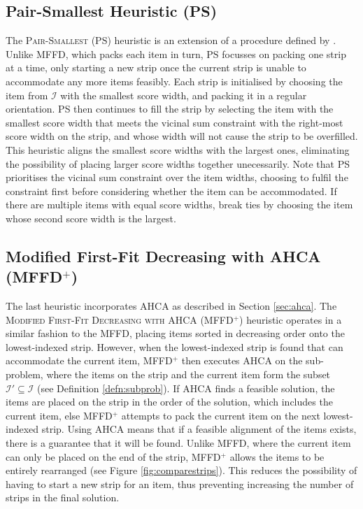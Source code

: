 \documentclass[oribibl]{llncs}
\begin{document}
\subsection{Pair-Smallest Heuristic (PS)}
\label{sec:ps}

The \textsc{Pair-Smallest} (PS) heuristic is an extension of a procedure defined by \cite{lewis2011}. Unlike MFFD, which packs each item in turn, PS focusses on packing one strip at a time, only starting a new strip once the current strip is unable to accommodate any more items feasibly. Each strip is initialised by choosing the item from $\mathcal{I}$ with the smallest score width, and packing it in a regular orientation. PS then continues to fill the strip by selecting the item with the smallest score width that meets the vicinal sum constraint with the right-most score width on the strip, and whose width will not cause the strip to be overfilled. This heuristic aligns the smallest score widths with the largest ones, eliminating the possibility of placing larger score widths together unecessarily. Note that PS prioritises the vicinal sum constraint over the item widths, choosing to fulfil the constraint first before considering whether the item can be accommodated. If there are multiple items with equal score widths, break ties by choosing the item whose second score width is the largest.



\subsection{Modified First-Fit Decreasing with AHCA (MFFD$^+$)}
\label{sec:mffd+}

The last heuristic incorporates AHCA as described in Section \ref{sec:ahca}. The \textsc{Modified First-Fit Decreasing with AHCA} (MFFD$^+$) heuristic operates in a similar fashion to the MFFD, placing items sorted in decreasing order onto the lowest-indexed strip. However, when the lowest-indexed strip is found that can accommodate the current item, MFFD$^+$ then executes AHCA on the sub-problem, where the items on the strip and the current item form the subset $\mathcal{I}' \subseteq \mathcal{I}$ (see Definition \ref{defn:subprob}). If AHCA finds a feasible solution, the items are placed on the strip in the order of the solution, which includes the current item, else MFFD$^+$ attempts to pack the current item on the next lowest-indexed strip. Using AHCA means that if a feasible alignment of the items exists, there is a guarantee that it will be found. Unlike MFFD, where the current item can only be placed on the end of the strip, MFFD$^+$ allows the items to be entirely rearranged (see Figure \ref{fig:comparestrips}). This reduces the possibility of having to start a new strip for an item, thus preventing increasing the number of strips in the final solution.
\end{document}
